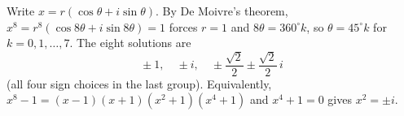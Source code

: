Write $x=r(\cos\theta+i\sin\theta)$. By De Moivre's theorem, $x^8=r^8(\cos8\theta+i\sin8\theta)=1$ forces $r=1$ and $8\theta=360^\circ k$, so $\theta=45^\circ k$ for $k=0,1,\dots,7$. The eight solutions are
\[
\boxed{\;\pm1,\quad\pm i,\quad\pm\dfrac{\sqrt2}{2}\pm\dfrac{\sqrt2}{2}\,i\;}
\]
(all four sign choices in the last group). Equivalently, $x^8-1=(x-1)(x+1)(x^2+1)(x^4+1)$ and $x^4+1=0$ gives $x^2=\pm i$.
